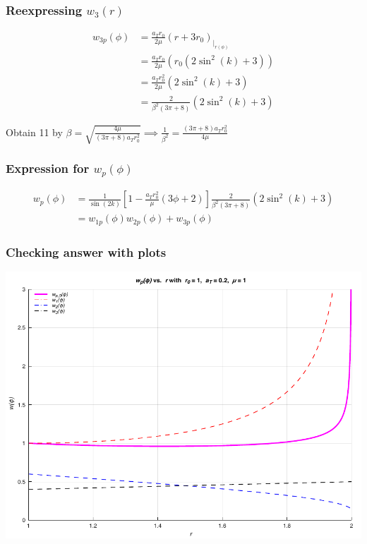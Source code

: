 \documentclass{beamer}
\begin{document}
\begin{frame}
    \frametitle{Reexpressing $w_3(r)$}

    \begin{align}
        w_{3p}(\phi)&=\frac{a_Tr_0}{2\mu}(r+3r_0)_{\big\rvert_{r(\phi)}}\\
        &=\frac{a_Tr_0}{2\mu}(r_0(2\sin^2(k)+3))\\
        &=\frac{a_Tr_0^2}{2\mu}(2\sin^2(k)+3)\\
        &=\frac{2}{\beta^2(3\pi+8)}(2\sin^2(k)+3)
    \end{align}

    Obtain 11 by $\beta=\sqrt{\frac{4\mu}{(3\pi+8)a_Tr_0^2}}\implies \frac{1}{\beta^2}=\frac{(3\pi+8)a_Tr_0^2}{4\mu}$
\end{frame}

\begin{frame}
    \frametitle{Expression for $w_p(\phi)$}

    \begin{align}
        w_p(\phi)&=\frac{1}{\sin(2k)}\left[1-\frac{a_Tr_0^2}{\mu}\left(3\phi+2\right)\right]\frac{2}{\beta^2(3\pi+8)}(2\sin^2(k)+3)\\
        &=w_{1p}(\phi)w_{2p}(\phi)+w_{3p}(\phi)
    \end{align}
\end{frame}

\begin{frame}
    \frametitle{Checking answer with plots}

    \begin{center}
        \includegraphics[scale=0.7]{plots/partA_phi.pdf}
    \end{center}
\end{frame}
\end{document}
